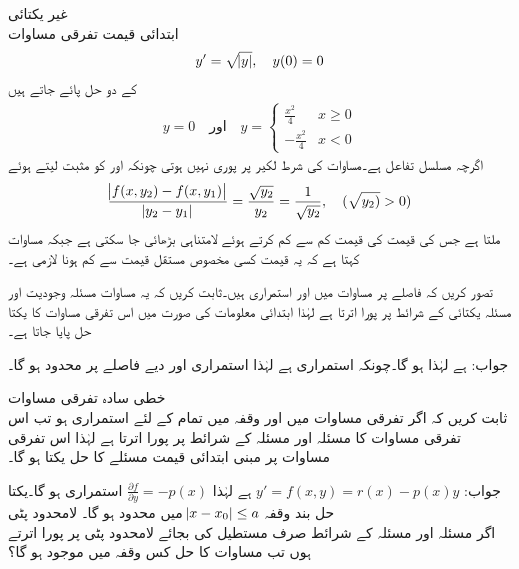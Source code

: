 \quad غیر یکتائی\\
ابتدائی قیمت تفرقی مساوات
\begin{align*}
y'=\sqrt{\abs{y}},\quad y(0)=0
\end{align*}
کے دو حل پائے جاتے ہیں
\begin{align*}
y=0 \quad \text{اور} \quad y=\begin{cases} \frac{x^2}{4} & x \ge 0\\ -\frac{x^2}{4} & x <0   \end{cases}
\end{align*}
اگرچہ  مسلسل تفاعل ہے۔مساوات  کی شرط لکیر  پر پوری نہیں ہوتی چونکہ  اور  کو مثبت لیتے ہوئے 
\begin{align*}
\frac{\abs{f(x,y_2)-f(x,y_1)}}{\abs{y_2-y_1}}=\frac{\sqrt{y_2}}{y_2}=\frac{1}{\sqrt{y_2}}, \quad (\sqrt{y_2)} >0)
\end{align*}
ملتا ہے جس کی قیمت  کی قیمت کم سے کم کرتے ہوئے لامتناہی بڑھائی جا سکتی ہے جبکہ مساوات  کہتا ہے کہ یہ قیمت کسی مخصوص مستقل قیمت  سے کم ہونا لازمی ہے۔


تصور کریں کہ  فاصلے پر مساوات  میں  اور  استمراری ہیں۔ثابت کریں کہ یہ مساوات  مسئلہ وجودیت اور مسئلہ یکتائی کے شرائط پر پورا اترتا ہے لہٰذا ابتدائی معلومات کی صورت میں اس تفرقی مساوات کا یکتا حل پایا جاتا ہے۔

جواب: ہے لہٰذا  ہو گا۔چونکہ  استمراری ہے لہٰذا   استمراری اور دیے فاصلے پر محدود ہو گا۔


\quad خطی سادہ تفرقی مساوات\\
ثابت کریں کہ اگر تفرقی مساوات  میں  اور   وقفہ  میں تمام  کے لئے استمراری ہو تب اس تفرقی مساوات کا  مسئلہ  اور مسئلہ  کے شرائط پر پورا اترتا ہے لہٰذا اس تفرقی مساوات پر مبنی ابتدائی قیمت مسئلے کا حل یکتا ہو گا۔ 

جواب:
$y'=f(x,y)=r(x)-p(x)y$
ہے لہٰذا 
$\frac{\partial f}{\partial y}=-p(x)$
استمراری ہو گا۔یکتا حل بند  وقفہ 
$\abs{x-x_0}\le a$
میں محدود ہو گا۔
\quad لامحدود پٹی\\
اگر مسئلہ  اور مسئلہ  کے شرائط صرف مستطیل کی بجائے لامحدود پٹی  پر پورا اترتے ہوں  تب مساوات  کا حل کس وقفہ میں موجود ہو گا؟

